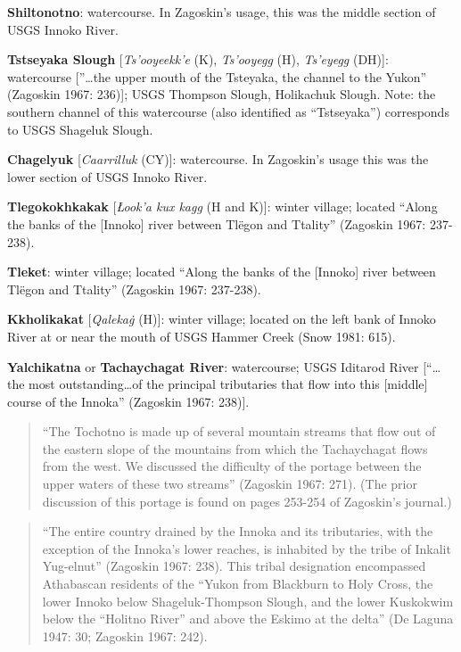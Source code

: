 \begin{hang}
\textbf{Shiltonotno}: watercourse. In Zagoskin’s usage, this was the middle section of USGS Innoko River.



\textbf{Tstseyaka Slough} [\textit{Ts’ooyeekk’e} (K), \textit{Ts’ooyegg} (H), \textit{Ts’eyegg} (DH)]: watercourse [”…the upper mouth of the Tsteyaka, the channel to the Yukon” (Zagoskin 1967: 236)]; USGS Thompson Slough, Holikachuk Slough. Note: the southern channel of this watercourse (also identified as “Tstseyaka”) corresponds to USGS Shageluk Slough.



\textbf{Chagelyuk} [\textit{Caarrilluk} (CY)]: watercourse. In Zagoskin’s usage this was the lower section of USGS Innoko River.



\textbf{Tlegokokhkakak} [\textit{Łook’a kux kagg} (H and K)]: winter village; located “Along the banks of the [Innoko] river between Tlëgon and Ttality” (Zagoskin 1967: 237-238).



\textbf{Tleket}: winter village; located “Along the banks of the [Innoko] river between Tlëgon and Ttality” (Zagoskin 1967: 237-238).



\textbf{Kkholikakat} [\textit{Qaleka\.g} (H)]: winter village; located on the left bank of Innoko River at or near the mouth of USGS Hammer Creek (Snow 1981: 615).



\textbf{Yalchikatna} or \textbf{Tachaychagat River}: watercourse; USGS Iditarod River [“…the most outstanding…of the principal tributaries that flow into this [middle] course of the Innoka” (Zagoskin 1967: 238)].



\begin{quote}“The Tochotno is made up of several mountain streams that flow out of the eastern slope of the mountains from which the Tachaychagat flows from the west. We discussed the difficulty of the portage between the upper waters of these two streams” (Zagoskin 1967: 271). (The prior discussion of this portage is found on pages 253-254 of Zagoskin’s journal.)
\end{quote}



\begin{quote}“The entire country drained by the Innoka and its tributaries, with the exception of the Innoka’s lower reaches, is inhabited by the tribe of Inkalit Yug-elnut” (Zagoskin 1967: 238). This tribal designation encompassed Athabascan residents of the “Yukon from Blackburn to Holy Cross, the lower Innoko below Shageluk-Thompson Slough, and the lower Kuskokwim below the “Holitno River” and above the Eskimo at the delta” (De Laguna 1947: 30; Zagoskin 1967: 242).
\end{quote}




\end{hang}

